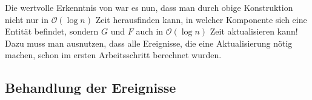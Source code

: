 Die wertvolle Erkenntnis von \textcite{parsaReeb} war es nun, dass man durch obige Konstruktion nicht nur in $\mathcal{O}(\log n)$ Zeit herausfinden kann, in welcher Komponente sich eine Entität befindet, sondern $G$ und $F$ auch in $\mathcal{O}(\log n)$ Zeit aktualisieren kann!
Dazu muss man ausnutzen, dass alle Ereignisse, die eine Aktualisierung nötig machen, schon im ersten Arbeitsschritt berechnet wurden.


\subsection{Behandlung der Ereignisse} %
\label{sub:behandlung_der_ereignisse}






